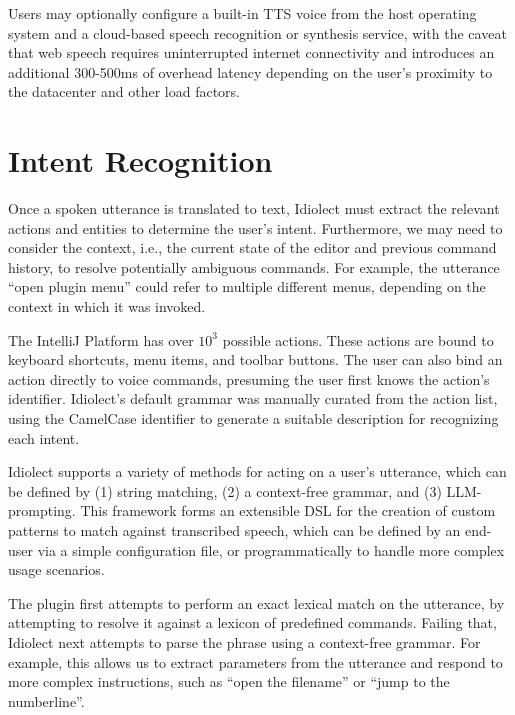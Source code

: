 \documentclass[conference]{IEEEtran}
\begin{document}

Users may optionally configure a built-in TTS voice from the host operating system and a cloud-based speech recognition or synthesis service, with the caveat that web speech requires uninterrupted internet connectivity and introduces an additional 300-500ms of overhead latency depending on the user's proximity to the datacenter and other load factors.

\section{Intent Recognition}

Once a spoken utterance is translated to text, Idiolect must extract the relevant actions and entities to determine the user's intent. Furthermore, we may need to consider the context, i.e., the current state of the editor and previous command history, to resolve potentially ambiguous commands. For example, the utterance ``open plugin menu'' could refer to multiple different menus, depending on the context in which it was invoked.

The IntelliJ Platform has over $10^3$ possible actions. These actions are bound to keyboard shortcuts, menu items, and toolbar buttons. The user can also bind an action directly to voice commands, presuming the user first knows the action's identifier. Idiolect's default grammar was manually curated from the action list, using the CamelCase identifier to generate a suitable description for recognizing each intent.

Idiolect supports a variety of methods for acting on a user's utterance, which can be defined by (1) string matching, (2) a context-free grammar, and (3) LLM-prompting. This framework forms an extensible DSL for the creation of custom patterns to match against transcribed speech, which can be defined by an end-user via a simple configuration file, or programmatically to handle more complex usage scenarios.

The plugin first attempts to perform an exact lexical match on the utterance, by attempting to resolve it against a lexicon of predefined commands. Failing that, Idiolect next attempts to parse the phrase using a context-free grammar. For example, this allows us to extract parameters from the utterance and respond to more complex instructions, such as ``open the \textlangle filename'' or ``jump to the \textlangle number\textrangle line''.
\end{document}
